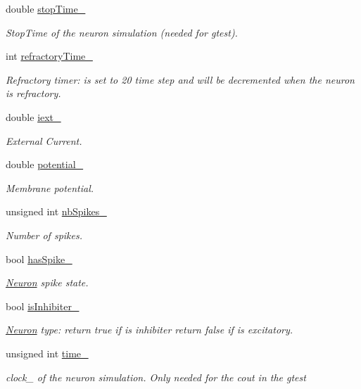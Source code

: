 \begin{DoxyCompactItemize}
\item 
double \hyperlink{classNeuron_aa38f38c0da520dc1cb5d374c70e974eb}{stop\-Time\-\_\-}
\begin{DoxyCompactList}\small\item\em Stop\-Time of the neuron simulation (needed for gtest). \end{DoxyCompactList}\item 
int \hyperlink{classNeuron_a28159eb51ce5e6a17d499d370b7e3db4}{refractory\-Time\-\_\-}
\begin{DoxyCompactList}\small\item\em Refractory timer\-: is set to 20 time step and will be decremented when the neuron is refractory. \end{DoxyCompactList}\item 
double \hyperlink{classNeuron_a44e7bbc4265ea4e0abe5d8f3d3bc5929}{iext\-\_\-}
\begin{DoxyCompactList}\small\item\em External Current. \end{DoxyCompactList}\item 
double \hyperlink{classNeuron_a91b43a5da7310e83fa2b66bf1be87b66}{potential\-\_\-}
\begin{DoxyCompactList}\small\item\em Membrane potential. \end{DoxyCompactList}\item 
unsigned int \hyperlink{classNeuron_a372b2a6f32c19f0462a305ab599df0fd}{nb\-Spikes\-\_\-}
\begin{DoxyCompactList}\small\item\em Number of spikes. \end{DoxyCompactList}\item 
bool \hyperlink{classNeuron_a4ad4b397db55b2b0b933e97768dba95a}{has\-Spike\-\_\-}
\begin{DoxyCompactList}\small\item\em \hyperlink{classNeuron}{Neuron} spike state. \end{DoxyCompactList}\item 
bool \hyperlink{classNeuron_a218ea40b8a1fba65ddb5420ac014fa04}{is\-Inhibiter\-\_\-}
\begin{DoxyCompactList}\small\item\em \hyperlink{classNeuron}{Neuron} type\-: return true if is inhibiter return false if is excitatory. \end{DoxyCompactList}\item 
unsigned int \hyperlink{classNeuron_a03bbbd9317ed48f469e589c33bc5356a}{time\-\_\-}
\begin{DoxyCompactList}\small\item\em clock\-\_\- of the neuron simulation. Only needed for the cout in the gtest \end{DoxyCompactList}\end{DoxyCompactItemize}


